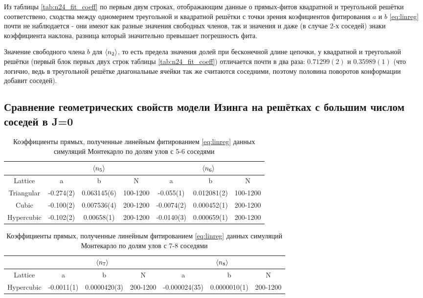 Из таблицы \ref{tab:n24_fit_coeff} по первым двум строках, отображающим данные о прямых-фитов квадратной и треугольной решётки соответствено, сходства между одномерием треугольной и квадратной решётки с точки зрения коэфициентов фитирования $a$ и $b$ \eqref{eq:linreg} почти не наблюдается - они имеют как разные значения свободных членов, так и значения и даже (в случае 2-х соседей) знаки коэффициента наклона, разница который значительно превышает погрешность фита. 

Значение свободного члена $b$ для $\langle n_{2} \rangle$, то есть предела значения долей при бесконечной длине цепочки, у квадратной и треугольной решётки (первый блок первых двух строк таблицы \ref{tab:n24_fit_coeff}) отличается почти в два раза: $0.71299(2)$ и $0.35989(1)$ (что логично, ведь в треугольной решётке диагональные ячейки так же считаются соседними, поэтому половина поворотов конформации добавит соседей).



\subsection{Сравнение геометрических свойств модели Изинга на решётках с большим числом соседей в J=0}

\begin{table}[]
    \centering
    \begin{tabular}{|c|c|c|c|c|c|c|} \hline
         & \multicolumn{3}{|c|}{$\langle n_{5} \rangle$} & \multicolumn{3}{|c|}{$\langle n_{6} \rangle$}  \\ \hline
        Lattice & a & b & N & a & b & N \\ \hline 
        Triangular & -0.274(2) & 0.063145(6) & 100-1200 & -0.055(1) & 0.012081(2) & 100-1200\\ \hline
        Cubic & -0.100(2) & 0.007536(4) & 200-1200 & -0.0074(2) & 0.000452(1) & 200-1200 \\ \hline
        Hypercubic & -0.102(2) & 0.00658(1) & 200-1200 & -0.0140(3) & 0.000659(1) & 200-1200\\ \hline
    \end{tabular}
    \caption{Коэффициенты прямых, полученные линейным фитированием \eqref{eq:linreg} данных симуляций Монтекарло по долям улов с 5-6 соседями}
    \label{tab:n56_fit_coeff}
\end{table}

\begin{table}[]
    \centering
    \begin{tabular}{|c|c|c|c|c|c|c|} \hline
         & \multicolumn{3}{|c|}{$\langle n_{7} \rangle$} & \multicolumn{3}{|c|}{$\langle n_{8} \rangle$}  \\ \hline
        Lattice & a & b & N & a & b & N \\ \hline 
        Hypercubic & -0.0011(1) & 0.0000420(3) & 200-1200 & -0.000024(35) & 0.0000010(1) & 200-1200\\ \hline
    \end{tabular}
    \caption{Коэффициенты прямых, полученные линейным фитированием \eqref{eq:linreg} данных симуляций Монтекарло по долям улов с 7-8 соседями}
    \label{tab:n78_fit_coeff}
\end{table}

